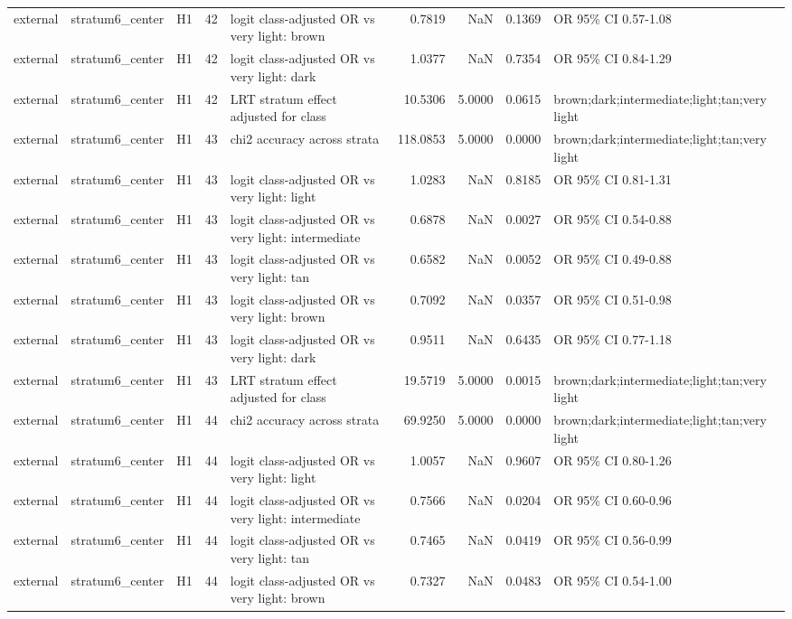 \begin{tabular}{lllrlrrrl}
external & stratum6\_center & H1 & 42 & logit class-adjusted OR vs very light: brown & 0.7819 & NaN & 0.1369 & OR 95\% CI 0.57-1.08 \\
external & stratum6\_center & H1 & 42 & logit class-adjusted OR vs very light: dark & 1.0377 & NaN & 0.7354 & OR 95\% CI 0.84-1.29 \\
external & stratum6\_center & H1 & 42 & LRT stratum effect adjusted for class & 10.5306 & 5.0000 & 0.0615 & brown;dark;intermediate;light;tan;very light \\
external & stratum6\_center & H1 & 43 & chi2 accuracy across strata & 118.0853 & 5.0000 & 0.0000 & brown;dark;intermediate;light;tan;very light \\
external & stratum6\_center & H1 & 43 & logit class-adjusted OR vs very light: light & 1.0283 & NaN & 0.8185 & OR 95\% CI 0.81-1.31 \\
external & stratum6\_center & H1 & 43 & logit class-adjusted OR vs very light: intermediate & 0.6878 & NaN & 0.0027 & OR 95\% CI 0.54-0.88 \\
external & stratum6\_center & H1 & 43 & logit class-adjusted OR vs very light: tan & 0.6582 & NaN & 0.0052 & OR 95\% CI 0.49-0.88 \\
external & stratum6\_center & H1 & 43 & logit class-adjusted OR vs very light: brown & 0.7092 & NaN & 0.0357 & OR 95\% CI 0.51-0.98 \\
external & stratum6\_center & H1 & 43 & logit class-adjusted OR vs very light: dark & 0.9511 & NaN & 0.6435 & OR 95\% CI 0.77-1.18 \\
external & stratum6\_center & H1 & 43 & LRT stratum effect adjusted for class & 19.5719 & 5.0000 & 0.0015 & brown;dark;intermediate;light;tan;very light \\
external & stratum6\_center & H1 & 44 & chi2 accuracy across strata & 69.9250 & 5.0000 & 0.0000 & brown;dark;intermediate;light;tan;very light \\
external & stratum6\_center & H1 & 44 & logit class-adjusted OR vs very light: light & 1.0057 & NaN & 0.9607 & OR 95\% CI 0.80-1.26 \\
external & stratum6\_center & H1 & 44 & logit class-adjusted OR vs very light: intermediate & 0.7566 & NaN & 0.0204 & OR 95\% CI 0.60-0.96 \\
external & stratum6\_center & H1 & 44 & logit class-adjusted OR vs very light: tan & 0.7465 & NaN & 0.0419 & OR 95\% CI 0.56-0.99 \\
external & stratum6\_center & H1 & 44 & logit class-adjusted OR vs very light: brown & 0.7327 & NaN & 0.0483 & OR 95\% CI 0.54-1.00 \\

\end{tabular}
